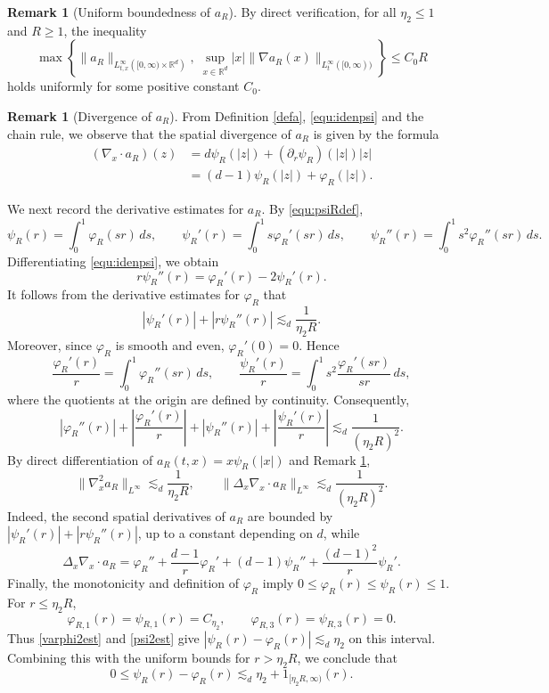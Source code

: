 \documentclass[reqno,11pt]{amsart}
\theoremstyle{plain}
\theoremstyle{definition}
\newtheorem{remark}[theorem]{Remark}
\numberwithin{equation}{section}
\numberwithin{theorem}{section}
\def\geq{\geqslant}
\def\leq{\leqslant}
\begin{document}
\begin{remark}[Uniform boundedness of $a_R$]
By direct verification, for all $\eta_2\leq1$ and $R\geq1$, the inequality  
\begin{equation}\label{arbound}
 \max \left\{ \|a_R\|_{L_{t, x}^{\infty}\left([0, \infty) \times \mathbb{R}^d\right)},\; \sup_{x \in \mathbb{R}^d} |x| \|\nabla a_R(x)\|_{L_t^{\infty}([0, \infty))} \right\} \leq C_0  R 
\end{equation}
holds uniformly for some positive constant $C_0$.
\end{remark}


\begin{remark}[Divergence of $a_{R}$]\label{dera}
From Definition \eqref{defa}, \eqref{equ:idenpsi} and the chain rule, we observe that the spatial divergence of $a_{R}$ is given by the formula
    \begin{align*}
\left(\nabla_{x} \cdot a_{R}\right)( z) & =d \psi_{R}(|z|) +\left(\partial_{r} \psi_{R}\right)(|z|) |z| \\
& =(d-1) \psi_{R}(|z|)+\varphi_{R}\left(|z|\right).
\end{align*}
\end{remark}



We next record the derivative estimates for $a_R$. By \eqref{equ:psiRdef},
\[
 \psi_R(r)=\int_0^1\varphi_R(sr)\,ds,\qquad
 \psi_R'(r)=\int_0^1s\varphi_R'(sr)\,ds,\qquad
 \psi_R''(r)=\int_0^1s^2\varphi_R''(sr)\,ds.
\]
Differentiating \eqref{equ:idenpsi}, we obtain
\[
 r\psi_R''(r)=\varphi_R'(r)-2\psi_R'(r).
\]
It follows from the derivative estimates for $\varphi_R$ that
\[
 |\psi_R'(r)|+|r\psi_R''(r)|\lesssim_d\frac1{\eta_2R}.
\]
Moreover, since $\varphi_R$ is smooth and even, $\varphi_R'(0)=0$. Hence
\[
 \frac{\varphi_R'(r)}r=\int_0^1\varphi_R''(sr)\,ds,\qquad
 \frac{\psi_R'(r)}r=\int_0^1s^2\frac{\varphi_R'(sr)}{sr}\,ds,
\]
where the quotients at the origin are defined by continuity. Consequently,
\[
 |\varphi_R''(r)|+\left|\frac{\varphi_R'(r)}r\right|
 +|\psi_R''(r)|+\left|\frac{\psi_R'(r)}r\right|
 \lesssim_d\frac1{(\eta_2R)^2}.
\]
By direct differentiation of $a_R(t,x)=x\psi_R(|x|)$ and Remark \ref{dera},
\[
 \|\nabla_x^2a_R\|_{L^\infty}\lesssim_d\frac1{\eta_2R},\qquad
 \|\Delta_x\nabla_x\cdot a_R\|_{L^\infty}
 \lesssim_d\frac1{(\eta_2R)^2}.
\]
Indeed, the second spatial derivatives of $a_R$ are bounded by
$|\psi_R'(r)|+|r\psi_R''(r)|$, up to a constant depending on $d$, while
\[
 \Delta_x\nabla_x\cdot a_R
 =\varphi_R''+\frac{d-1}{r}\varphi_R'
 +(d-1)\psi_R''+\frac{(d-1)^2}{r}\psi_R'.
\]
Finally, the monotonicity and definition of $\varphi_R$ imply
$0\leq\varphi_R(r)\leq\psi_R(r)\leq1$. For $r\leq\eta_2R$,
\[
 \varphi_{R,1}(r)=\psi_{R,1}(r)=C_{\eta_2},\qquad
 \varphi_{R,3}(r)=\psi_{R,3}(r)=0.
\]
Thus \eqref{varphi2est} and \eqref{psi2est} give
$|\psi_R(r)-\varphi_R(r)|\lesssim_d\eta_2$ on this interval. Combining
this with the uniform bounds for $r>\eta_2R$, we conclude that
\[
 0\leq\psi_R(r)-\varphi_R(r)
 \lesssim_d\eta_2+1_{[\eta_2R,\infty)}(r).
\]
\end{document}
